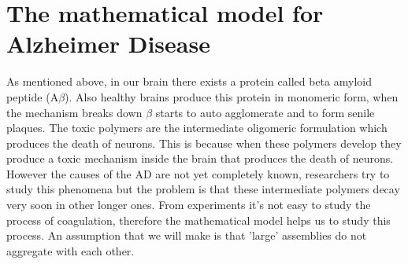 \section{The mathematical model for Alzheimer Disease}
As mentioned above, in our brain there exists a protein called beta amyloid peptide ($\mathrm{A} \beta$). Also healthy brains produce this protein in monomeric form, when the mechanism breaks down \(\beta\) starts to auto agglomerate and to form senile plaques. The toxic polymers are the intermediate oligomeric formulation which produces the death of neurons. This is because when these polymers develop they produce a toxic mechanism inside the brain that produces the death of neurons. However the causes of the AD are not yet completely known, researchers try to study this phenomena but the problem is that these intermediate polymers decay very soon in other longer ones. From experiments it's not easy to study  the process of coagulation, therefore the mathematical model helps us to study this process. An assumption that we will make is that 'large' assemblies do not aggregate with each other.
